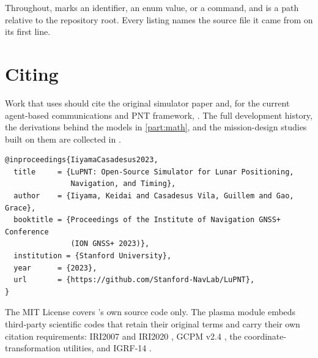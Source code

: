 Throughout,  marks an identifier, an enum value, or a command,
and  is a path relative to the repository root. Every
listing names the source file it came from on its first line.

\section{Citing \lupnt{}}
\label{sec:intro-citing}

Work that uses \lupnt{} should cite the original simulator paper
\citep{iiyama2023lupnt} and, for the current agent-based communications and PNT
framework, \citep{casadesus2025lupnt}. The full development history, the
derivations behind the models in \cref{part:math}, and the mission-design
studies built on them are collected in \citep{iiyama2026thesis}.

\begin{lstlisting}[language=bibtexlang]
@inproceedings{IiyamaCasadesus2023,
  title     = {LuPNT: Open-Source Simulator for Lunar Positioning,
               Navigation, and Timing},
  author    = {Iiyama, Keidai and Casadesus Vila, Guillem and Gao, Grace},
  booktitle = {Proceedings of the Institute of Navigation GNSS+ Conference
               (ION GNSS+ 2023)},
  institution = {Stanford University},
  year      = {2023},
  url       = {https://github.com/Stanford-NavLab/LuPNT},
}
\end{lstlisting}

The MIT License covers \lupnt{}'s own source code only. The plasma module
embeds third-party scientific codes that retain their original terms and
carry their own citation requirements: IRI2007 and IRI2020
\citep{bilitza2022iri}, GCPM v2.4 \citep{gallagher2000gcpm}, the 
coordinate-transformation utilities, and IGRF-14 \citep{alken2021igrf}.
